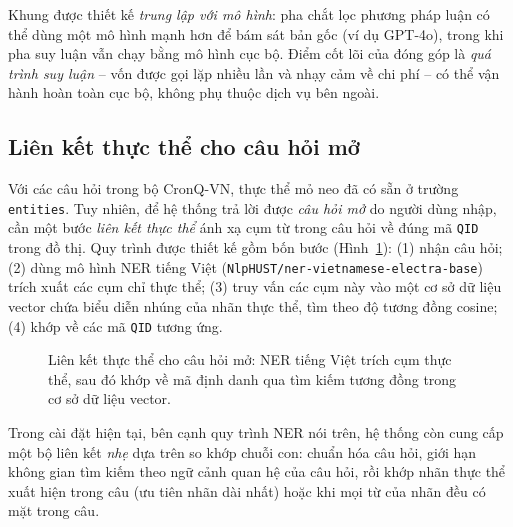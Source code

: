 Khung được thiết kế \emph{trung lập với mô hình}: pha chắt lọc phương pháp luận có thể dùng một mô
hình mạnh hơn để bám sát bản gốc (ví dụ GPT-4o), trong khi pha suy luận vẫn chạy bằng mô hình cục
bộ. Điểm cốt lõi của đóng góp là \emph{quá trình suy luận} -- vốn được gọi lặp nhiều lần và nhạy
cảm về chi phí -- có thể vận hành hoàn toàn cục bộ, không phụ thuộc dịch vụ bên ngoài.

\subsection{Liên kết thực thể cho câu hỏi mở}
\label{sec:entity-linking}

Với các câu hỏi trong bộ CronQ-VN, thực thể mỏ neo đã có sẵn ở trường \texttt{entities}. Tuy nhiên,
để hệ thống trả lời được \emph{câu hỏi mở} do người dùng nhập, cần một bước \emph{liên kết thực thể}
ánh xạ cụm từ trong câu hỏi về đúng mã \texttt{QID} trong đồ thị. Quy trình được thiết kế gồm bốn
bước (Hình~\ref{fig:entity-linking}): (1) nhận câu hỏi; (2) dùng mô hình NER tiếng Việt
(\texttt{NlpHUST/ner-vietnamese-electra-base}) trích xuất các cụm chỉ thực thể; (3) truy vấn các cụm
này vào một cơ sở dữ liệu vector chứa biểu diễn nhúng của nhãn thực thể, tìm theo độ tương đồng
cosine; (4) khớp về các mã \texttt{QID} tương ứng.

\begin{figure}[ht]
  \centering
  \caption{Liên kết thực thể cho câu hỏi mở: NER tiếng Việt trích cụm thực thể, sau đó khớp về mã
  định danh qua tìm kiếm tương đồng trong cơ sở dữ liệu vector. }
  \label{fig:entity-linking}
\end{figure}

Trong cài đặt hiện tại, bên cạnh quy trình NER nói trên, hệ thống còn cung cấp một bộ liên kết
\emph{nhẹ} dựa trên so khớp chuỗi con: chuẩn hóa câu hỏi, giới hạn không gian tìm kiếm theo ngữ cảnh
quan hệ của câu hỏi, rồi khớp nhãn thực thể xuất hiện trong câu (ưu tiên nhãn dài nhất) hoặc khi mọi
từ của nhãn đều có mặt trong câu. 

